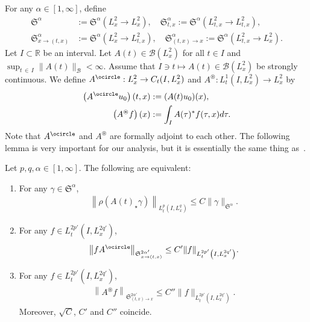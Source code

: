 \documentclass[AHL,Unicode,longabstracts,MathTools,published]{cedram}
\newcommand{\oast}{\circledast}
\newcommand{\CB}{\mathcal{B}}
\newcommand{\FS}{\mathfrak{S}}
\newcommand{\al}{\alpha}
\newcommand{\ga}{\gamma}
\newcommand{\ta}{\tau}
\newcommand{\rh}{\rho}
\newcommand{\I}{\infty}
\newcommand{\tx}{{t,x}}
\newcommand{\st}{\star}
\newcommand{\R}{\mathbb{R}}
\newcommand{\oc}{\ocircle}
\newcommand{\os}{\oast}
\begin{document}
For any $\al \in [1, \I]$, define
\begin{align}
\FS^\alpha &:= \FS^\alpha\left(L^2_x \to L^2_x\right),
\quad \FS^\al_{t,x} := \FS^\al\left(L^2_{t,x} \to L^2_\tx\right), \\
\FS^\al_{x \to (t,x)} &:= \FS^\al\left(L^2_x \to L^2_{t,x}\right),
\quad \FS^\alpha_{(t,x) \to x} := \FS^\al\left(L^2_{t,x} \to L^2_x\right).
\end{align}
Let $I \subset \R$ be an interval. Let $A(t) \in \CB(L^2_x)$ for all $t \in I$ and $\sup_{t \,\in\,I} \|A(t)\|_{\CB} < \I$. Assume that $I \ni t \mapsto A(t) \in \CB(L^2_x)$ be strongly continuous. We define $A^\ocircle : L^2_x \to C_t(I,L^2_x)$ and $A^\oast : L^1_t(I,L^2_x) \to L^2_x$ by
\begin{align}
\left(A^\ocircle u_0\right)(t,x) &:= (A(t)u_0)(x), \\
\left(A^\oast f\right)(x) &:= \int_I A(\ta)^* f(\ta,x) d\ta.
\end{align}
Note that $A^\ocircle$ and $A^\oast$ are formally adjoint to each other. The following lemma is very important for our analysis, but it is essentially the same thing as~\cite[Lemma~3]{2017FS}.
\begin{lemm} \label{DP}
Let $p,q,\al \in [1,\I]$. The following are equivalent:
\begin{enumerate}
\item\label{lemm3.2.1} For any $\ga \in \FS^\al$,
\begin{align}\label{SS}
\left\|\rh(A(t)_\st \ga)\right\|_{L^p_t\left(I,L^q_x\right)} \le C \|\ga\|_{\FS^\al}.
\end{align}
\item\label{lemm3.2.2} For any $f \in L^{2p'}_t(I,L^{2q'}_x)$,
\begin{align}\label{HSS}
\left\|f A^\oc\right\|_{\FS^{2\al'}_{x \to (\tx)}} \le C'\|f\|_{L^{2p'}_t\left(I,L^{2q'}_x\right)}.
\end{align}
\item\label{lemm3.2.3} For any $f \in L^{2p'}_t(I,L^{2q'}_x)$,
\begin{align}\label{HSS}
\left\|A^\os f\right\|_{\FS^{2\al'}_{(\tx) \to x}} \le C''\|f\|_{L^{2p'}_t\left(I,L^{2q'}_x\right)}.
\end{align}
Moreover, $\sqrt{C}$, $C'$ and $C''$ coincide.
\end{enumerate}
\end{lemm}
\end{document}
